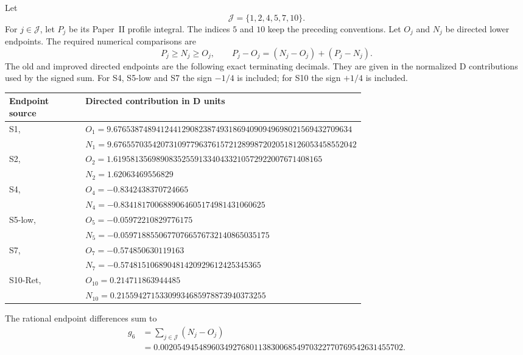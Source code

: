 Let
\begin{equation}\label{eq:retB-six-index}
 \mathcal J=\{1,2,4,5,7,10\}.
\end{equation}
For $j\in\mathcal J$, let $P_j$ be its Paper~II profile integral.
The indices $5$ and $10$ keep the preceding conventions.
Let $O_j$ and $N_j$ be directed lower endpoints.
The required numerical comparisons are
\begin{equation}\label{eq:retB-six-comparison}
 P_j\ge N_j\ge O_j,\qquad
 P_j-O_j=(N_j-O_j)+(P_j-N_j).
\end{equation}
The old and improved directed endpoints are the following exact terminating
decimals. They are given in the normalized D
contributions used by the signed sum. For S4, S5-low and S7 the sign $-1/4$ is included; for S10
the sign $+1/4$ is included.
\begin{center}
\small
\renewcommand{\arraystretch}{1.08}
\begin{tabular}{@{}lp{0.68\linewidth}@{}}
\hline
Endpoint source & Directed contribution in D units\\
\hline
S1, \cite[(A.4), (A.5a)]{PaperII} & $O_1=9.67653874894124412908238749318694090949698021569432709634$\\
 & $N_1=9.676557035420731097796376157212899872020518126053458552042$\\
S2, \cite[(A.8), (A.8a)]{PaperII} & $O_2=1.6195813569890835255913340433210572922007671408165$\\
 & $N_2=1.62063469556829$\\
S4, \cite[Appendix~A.2--A.6]{PaperII} & $O_4=-0.8342438370724665$\\
 & $N_4=-0.8341817006889064605174981431060625$\\
S5-low, \cite[Appendix~A.2--A.6]{PaperII} & $O_5=-0.05972210829776175$\\
 & $N_5=-0.05971885506770766576732140865035175$\\
S7, \cite[Appendix~A.2--A.6]{PaperII} & $O_7=-0.574850630119163$\\
 & $N_7=-0.574815106890481420929612425345365$\\
S10-Ret, \cite[Appendix~A.2--A.6]{PaperII} & $O_{10}=0.214711863944485$\\
 & $N_{10}=0.21559427153309934685978873940373255$\\
\hline
\end{tabular}
\end{center}
The rational endpoint differences sum to
\begin{equation}\label{eq:retB-six-gain}
\begin{aligned}
 g_6&=\sum_{j\in\mathcal J}(N_j-O_j)\\
 &=0.002054945489603492768011383006854970322770769542631455702.
\end{aligned}
\end{equation}
